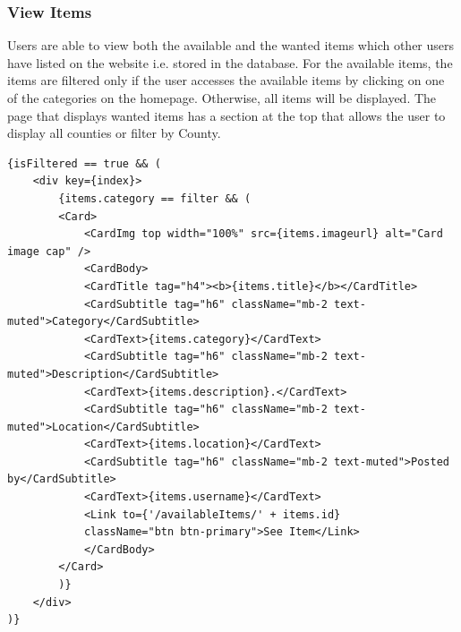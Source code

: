 \subsubsection{View Items}
Users are able to view both the available and the wanted items which other users have listed on the website i.e. stored in the database. For the available items, the items are filtered only if the user accesses the available items by clicking on one of the categories on the homepage. Otherwise, all items will be displayed. The page that displays wanted items has a section at the top that allows the user to display all counties or filter by County.
\begin{verbatim}
{isFiltered == true && (
    <div key={index}>
        {items.category == filter && (
        <Card>
            <CardImg top width="100%" src={items.imageurl} alt="Card image cap" />
            <CardBody>
            <CardTitle tag="h4"><b>{items.title}</b></CardTitle>
            <CardSubtitle tag="h6" className="mb-2 text-muted">Category</CardSubtitle>
            <CardText>{items.category}</CardText>
            <CardSubtitle tag="h6" className="mb-2 text-muted">Description</CardSubtitle>
            <CardText>{items.description}.</CardText>
            <CardSubtitle tag="h6" className="mb-2 text-muted">Location</CardSubtitle>
            <CardText>{items.location}</CardText>
            <CardSubtitle tag="h6" className="mb-2 text-muted">Posted by</CardSubtitle>
            <CardText>{items.username}</CardText>
            <Link to={'/availableItems/' + items.id}
            className="btn btn-primary">See Item</Link>
            </CardBody>
        </Card>
        )}
    </div>
)}
\end{verbatim}

